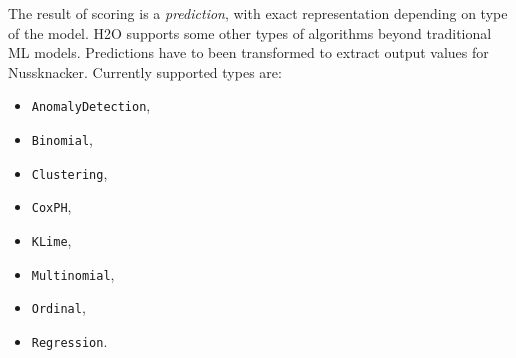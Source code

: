 The result of scoring is a \emph{prediction}, with exact representation depending on type of the model.
H2O supports some other types of algorithms beyond traditional ML models.
Predictions have to been transformed to extract output values for Nussknacker.
Currently supported types are:
\begin{itemize}
  \item \texttt{AnomalyDetection},
  \item \texttt{Binomial},
  \item \texttt{Clustering},
  \item \texttt{CoxPH},
  \item \texttt{KLime},
  \item \texttt{Multinomial},
  \item \texttt{Ordinal},
  \item \texttt{Regression}.
\end{itemize}
